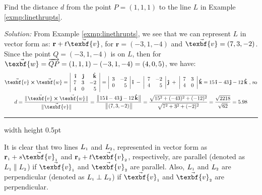 \begin{exmp}
 Find the distance $d$ from the point $P = (1,1,1)$ to the line $L$ in Example \ref{exmp:linethrupts}.\vspace{1mm}
 \par\noindent\emph{Solution:} From Example \ref{exmp:linethrupts}, we see that we can represent $L$ in vector form as:
 $\textbf{r} + t \vec{\texbf{v}}$, for $\textbf{r} = (-3,1,-4)$ and $\vec{\texbf{v}} = (7,3,-2)$. Since the point $Q = (-3,1,-4)$
 is on $L$, then for $\vec{\texbf{w}} = \overrightarrow{QP} = (1,1,1) - (-3,1,-4) = (4,0,5)$, we have:
 \begin{gather*}
  \Crossprod{\vec{\texbf{v}}}{\vec{\texbf{w}}} = \left|\begin{array}{rrr}\boldsymbol{\hat{\textbf{\i}}} & \boldsymbol{\hat{\textbf{\j}}} & \boldsymbol{\hat{\textbf{k}}}\\7 & 3 & -2\\
   4 & 0 & 5\end{array}\right|
   = \left|\begin{array}{rr}3 & -2\\0 & 5\end{array}\right| \boldsymbol{\hat{\textbf{\i}}} \;-\;
     \left|\begin{array}{rr}7 & -2\\4 & 5\end{array}\right| \boldsymbol{\hat{\textbf{\j}}} \;+\;
     \left|\begin{array}{rr}7 & 3\\4 & 0\end{array}\right| \boldsymbol{\hat{\textbf{k}}}
   = 15\,\boldsymbol{\hat{\textbf{\i}}} - 43\,\boldsymbol{\hat{\textbf{\j}}} - 12\,\boldsymbol{\hat{\textbf{k}}} \text{~,~so}\\
  d = \frac{\norm{\Crossprod{\vec{\texbf{v}}}{\vec{\texbf{w}}}}}{\norm{\vec{\texbf{v}}}} =
   \frac{\Norm{15\,\boldsymbol{\hat{\textbf{\i}}} - 43\,\boldsymbol{\hat{\textbf{\j}}} - 12\,\boldsymbol{\hat{\textbf{k}}}}}{\Norm{(7,3,-2)}}
  = \frac{\sqrt{15^2 + (-43)^2 + (-12)^2}}{\sqrt{7^2 + 3^2 + (-2)^2}}
  = \frac{\sqrt{2218}}{\sqrt{62}} = 5.98
 \end{gather*}
\end{exmp}\vspace{-1mm}
\hrule width \textwidth height 0.5pt
\vspace{2mm}

It is clear that two lines $L_{\scriptscriptstyle 1}$ and $L_{\scriptscriptstyle 2}$, represented in vector form as
$\ssub{\textbf{r}}{1} + s \ssub{\vec{\texbf{v}}}{1}$ and $\ssub{\textbf{r}}{2} + t \ssub{\vec{\texbf{v}}}{2}$, respectively, are
parallel (denoted as $L_{\scriptscriptstyle 1} \parallel L_{\scriptscriptstyle 2}$) if $\ssub{\vec{\texbf{v}}}{1}$ and $\ssub{\vec{\texbf{v}}}{2}$ are
parallel. Also, $L_{\scriptscriptstyle 1}$ and $L_{\scriptscriptstyle 2}$ are perpendicular (denoted as $L_{\scriptscriptstyle 1} \perp L_{\scriptscriptstyle 2}$) if
$\ssub{\vec{\texbf{v}}}{1}$ and $\ssub{\vec{\texbf{v}}}{2}$ are perpendicular.

